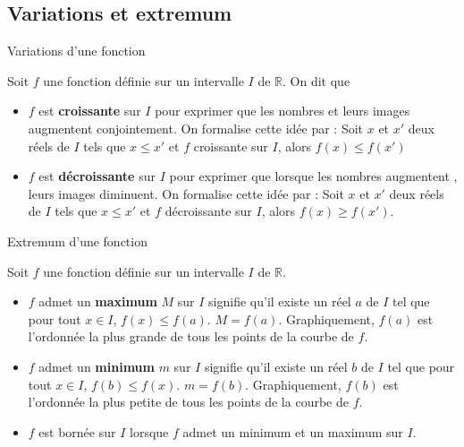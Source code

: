 \begin{pageCours} %


\section{Variations et extremum}

 
\begin{ThT}{Variations d'une fonction}

Soit $f$ une fonction définie sur un intervalle $I$ de $\mathbb R$. On dit que 
\begin{itemize}[leftmargin=*]
\item $f$ est \textbf{croissante} sur $I$ pour exprimer que les nombres et leurs images augmentent conjointement. On formalise cette idée par : Soit $x$ et $x'$ deux réels de $I$ tels que $x\leq x'$ et $f$ croissante sur $I$, alors $f(x) \leq f(x')$
\item $f$ est \textbf{décroissante} sur $I$ pour exprimer que lorsque les nombres augmentent , leurs images diminuent. On formalise cette idée par : Soit $x$ et $x'$ deux réels de $I$ tels que $x\leq x'$ et $f$ décroissante sur $I$, alors $f(x) \geq f(x')$.
\end{itemize} 
\end{ThT} 

  

%

\begin{DefT}{Extremum d'une fonction}

Soit $f$ une fonction définie sur un intervalle $I$ de $\mathbb R$. 
\begin{itemize}[leftmargin=*]
\item $f$ admet un \textbf{maximum} $M$ sur $I$ signifie qu'il existe un réel $a$ de $I$ tel que pour tout $x \in I$, $f(x)\leq f(a)$. $M=f(a)$. Graphiquement, $f(a)$ est l'ordonnée la plus grande de tous les points de la courbe de $f$.
\item $f$ admet un \textbf{minimum} $m$ sur $I$ signifie qu'il existe un réel $b$ de $I$ tel que pour tout $x \in I$, $f(b) \leq f(x)$. $m=f(b)$. Graphiquement, $f(b)$ est l'ordonnée la plus petite de tous les points de la courbe de $f$.
\item $f$ est bornée sur $I$ lorsque $f$ admet un minimum et un maximum sur $I$.
\end{itemize} 
\end{DefT} 




\end{pageCours}
